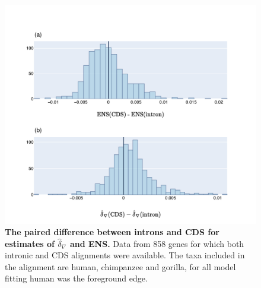 \begin{figure}[htbp]
\centering
\includegraphics[width=\textwidth]{figures/plots/primate/d-conv-diff.pdf}
\caption[The paired difference between introns and CDS for estimates of $\hat\delta_\nabla$ and ENS]{\textbf{The paired difference between introns and CDS for estimates of $\hat\delta_\nabla$ and ENS.} Data from 858 genes for which  both intronic and CDS alignments were available. The taxa included in the alignment are human, chimpanzee and gorilla, for all model fitting human was the foreground edge.}
\label{fig:primate:dconv-diff}
\end{figure}
